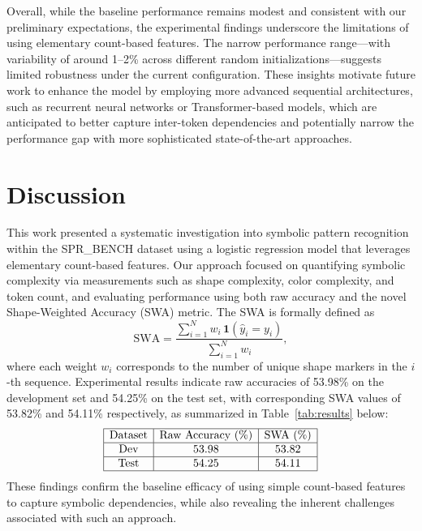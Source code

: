 \documentclass{article}
\begin{document}
Overall, while the baseline performance remains modest and consistent with our preliminary expectations, the experimental findings underscore the limitations of using elementary count-based features. The narrow performance range—with variability of around 1--2\% across different random initializations—suggests limited robustness under the current configuration. These insights motivate future work to enhance the model by employing more advanced sequential architectures, such as recurrent neural networks or Transformer-based models, which are anticipated to better capture inter-token dependencies and potentially narrow the performance gap with more sophisticated state-of-the-art approaches.

\section{Discussion}
This work presented a systematic investigation into symbolic pattern recognition within the SPR\_BENCH dataset using a logistic regression model that leverages elementary count-based features. Our approach focused on quantifying symbolic complexity via measurements such as shape complexity, color complexity, and token count, and evaluating performance using both raw accuracy and the novel Shape-Weighted Accuracy (SWA) metric. The SWA is formally defined as 
\[
\mathrm{SWA} = \frac{\sum_{i=1}^{N} w_i\,\mathbf{1}(\hat{y}_i=y_i)}{\sum_{i=1}^{N} w_i},
\]
where each weight \(w_i\) corresponds to the number of unique shape markers in the \(i\)-th sequence. Experimental results indicate raw accuracies of 53.98\% on the development set and 54.25\% on the test set, with corresponding SWA values of 53.82\% and 54.11\% respectively, as summarized in Table~\ref{tab:results} below:
\[
\begin{array}{|c|c|c|}
\hline
\text{Dataset} & \text{Raw Accuracy (\%)} & \text{SWA (\%)} \\
\hline
\text{Dev} & 53.98 & 53.82 \\
\hline
\text{Test} & 54.25 & 54.11 \\
\hline
\end{array}
\]
These findings confirm the baseline efficacy of using simple count-based features to capture symbolic dependencies, while also revealing the inherent challenges associated with such an approach.
\end{document}

